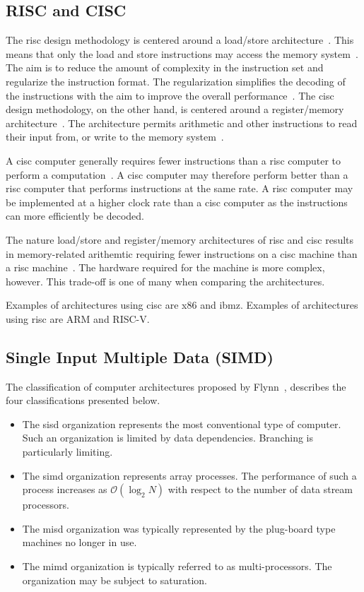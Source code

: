 \subsection{RISC and CISC}

The \acrfull{risc} design methodology is centered around a load/store architecture~\cite{flynn1998}. This means that only the load and store instructions may access the memory system~\cite{carter2002}. The aim is to reduce the amount of complexity in the instruction set and regularize the instruction format. The regularization simplifies the decoding of the instructions with the aim to improve the overall performance~\cite{flynn1998}. The \acrfull{cisc} design methodology, on the other hand, is centered around a register/memory architecture~\cite{flynn1998}. The architecture permits arithmetic and other instructions to read their input from, or write to the memory system~\cite{carter2002}.

A \gls{cisc} computer generally requires fewer instructions than a \gls{risc} computer to perform a computation~\cite{carter2002}. A \gls{cisc} computer may therefore perform better than a \gls{risc} computer that performs instructions at the same rate. A \gls{risc} computer may be implemented at a higher clock rate than a \gls{cisc} computer as the instructions can more efficiently be decoded.

The nature load/store and register/memory architectures of \gls{risc} and \gls{cisc} results in memory-related arithemtic requiring fewer instructions on a \gls{cisc} machine than a \gls{risc} machine~\cite{carter2002}. The hardware required for the machine is more complex, however. This trade-off is one of many when comparing the architectures.

Examples of architectures using \gls{cisc} are \gls{x86} and \gls{ibmz}. Examples of architectures using \gls{risc} are ARM and RISC-V.

\subsection{Single Input Multiple Data (SIMD)}
\label{section:background:simd-avx}

The classification of computer architectures proposed by Flynn~\cite{flynn1972}, describes the four classifications presented below.

\begin{itemize}
    \item The \gls{sisd} organization represents the most conventional type of computer. Such an organization is limited by data dependencies. Branching is particularly limiting.
    \item The \gls{simd} organization represents array processes. The performance of such a process increases as $\mathcal{O}(\log_2 N)$ with respect to the number of data stream processors. 
    \item The \gls{misd} organization was typically represented by the plug-board type machines no longer in use.
    \item The \gls{mimd} organization is typically referred to as multi-processors. The organization may be subject to saturation.
\end{itemize}

